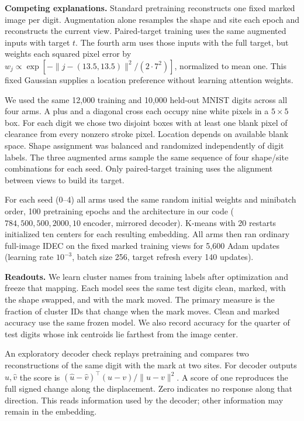 \textbf{Competing explanations.} Standard pretraining reconstructs one fixed marked image per digit. Augmentation alone resamples the shape and site each epoch and reconstructs the current view. Paired-target training uses the same augmented inputs with target $t$. The fourth arm uses those inputs with the full target, but weights each squared pixel error by $w_j\propto\exp[-\|j-(13.5,13.5)\|^2/(2\cdot7^2)]$, normalized to mean one. This fixed Gaussian supplies a location preference without learning attention weights.

\newpage
{}
We used the same 12,000 training and 10,000 held-out MNIST digits across all four arms. A plus and a diagonal cross each occupy nine white pixels in a $5\times5$ box. For each digit we chose two disjoint boxes with at least one blank pixel of clearance from every nonzero stroke pixel. Location depends on available blank space. Shape assignment was balanced and randomized independently of digit labels. The three augmented arms sample the same sequence of four shape/site combinations for each seed. Only paired-target training uses the alignment between views to build its target.

For each seed (0--4) all arms used the same random initial weights and minibatch order, 100 pretraining epochs and the architecture in our code ($784,500,500,2000,10$ encoder, mirrored decoder). K-means with 20 restarts initialized ten centers for each resulting embedding. All arms then ran ordinary full-image IDEC on the fixed marked training views for 5,600 Adam updates (learning rate $10^{-3}$, batch size 256, target refresh every 140 updates).

\textbf{Readouts.} We learn cluster names from training labels after optimization and freeze that mapping. Each model sees the same test digits clean, marked, with the shape swapped, and with the mark moved. The primary measure is the fraction of cluster IDs that change when the mark moves. Clean and marked accuracy use the same frozen model. We also record accuracy for the quarter of test digits whose ink centroids lie farthest from the image center.

An exploratory decoder check replays pretraining and compares two reconstructions of the same digit with the mark at two sites. For decoder outputs $\hat u,\hat v$ the score is $(\hat u-\hat v)^\top(u-v)/\|u-v\|^2$. A score of one reproduces the full signed change along the displacement. Zero indicates no response along that direction. This reads information used by the decoder; other information may remain in the embedding.

\begin{center}\small
\setlength{\tabcolsep}{3pt}

\end{center}


\newpage
{}


